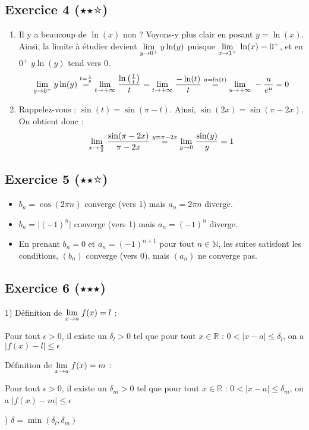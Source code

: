 \documentclass{article}
\newcommand{\Lim}[1]{\raisebox{0.0ex}{\scalebox{1}{$\displaystyle \lim_{#1}\;$}}}
\begin{document}
\subsection{Exercice 4 ($\medblackstar \medblackstar \medwhitestar$)}

\begin{enumerate}
    \item Il y a beaucoup de $\ln(x)$ non ? Voyons-y plus clair en posant $y = \ln(x)$. Ainsi, la limite à étudier devient $\Lim{y \to 0^+} y\ln(y)$ puisque $\Lim{x \to 1^+} \ln(x) = 0^+$, et en $0^+$ $y\ln(y)$ tend vers $0$.
    $$
    \Lim{y \to 0^+} y\ln(y) \overset{t = \frac{1}{y}}{=}\Lim{t \to +\infty} \frac{\ln\left(\frac{1}{t}\right)}{t} = \Lim{t \to +\infty} \frac{-\ln(t)}{t} \overset{u = ln(t)}{=} \Lim{u \to +\infty} -\frac{u}{e^u} = 0
    $$
    \item Rappelez-vous : $\sin(t) = \sin(\pi-t)$. Ainsi, $\sin(2x) = \sin(\pi-2x)$. On obtient donc :
    $$
    \Lim{x \to \frac{\pi}{2}} \frac{\sin(\pi-2x)}{\pi -2x} \overset{y = \pi-2x}{=} \Lim{y \to 0} \frac{\sin(y)}{y} = 1
    $$
\end{enumerate}

\subsection{Exercice 5 ($\medblackstar \medblackstar \medwhitestar$)}

\begin{itemize}
    \item $b_n = \cos(2\pi n)$ converge (vers 1) mais $a_n = 2\pi n$ diverge.
    \item $b_n = \lvert {(-1)}^n \rvert$ converge (vers 1) mais $a_n = {(-1)}^n$ diverge.
    \item En prenant $b_n = 0$ et $a_n = (-1)^{n+1}$ pour tout $n \in \mathbb{N}$, les suites satisfont les conditions, $(b_n)$ converge (vers 0), mais $(a_n)$ ne converge pas.
\end{itemize}

\subsection{Exercice 6 ($\medblackstar \medblackstar \medblackstar$)}

1) Définition de $\Lim{x \to a} f(x) = l$ :
\begin{center}
    Pour tout $\epsilon > 0$, il existe un $\delta_l >0$ tel que pour tout $x \in \mathbb{R}$ : $0 < \lvert x - a \rvert \leq \delta_l$, on a $\lvert f(x) - l \rvert \leq \epsilon$
\end{center}
Définition de $\Lim{x \to a} f(x) = m$ :
\begin{center}
    Pour tout $\epsilon > 0$, il existe un $\delta_m >0$ tel que pour tout $x \in \mathbb{R}$ : $0 < \lvert x - a \rvert \leq \delta_m$, on a $\lvert f(x) - m \rvert \leq \epsilon$
\end{center}
) $\delta = \min(\delta_l, \delta_m)$\\
\end{document}
